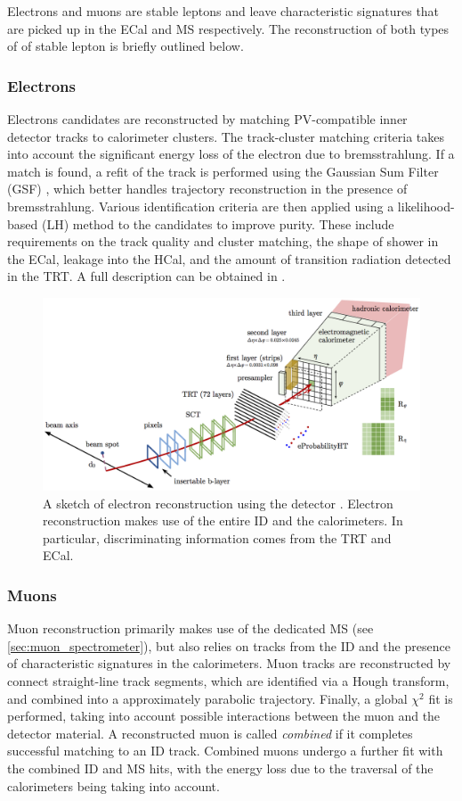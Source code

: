 Electrons and muons are stable leptons and leave characteristic signatures that are picked up in the ECal and MS respectively.
The reconstruction of both types of of stable lepton is briefly outlined below.

\subsubsection{Electrons}
Electrons candidates are reconstructed by matching PV-compatible inner detector tracks to calorimeter clusters.
The track-cluster matching criteria takes into account the significant energy loss of the electron due to bremsstrahlung.
If a match is found, a refit of the track is performed using the Gaussian Sum Filter (GSF) \cite{ATLAS-CONF-2012-047}, which better handles trajectory reconstruction in the presence of bremsstrahlung.
Various identification criteria are then applied using a  likelihood-based (LH) method to the candidates to improve purity.
These include requirements on the track quality and cluster matching, the shape of shower in the ECal, leakage into the HCal, and the amount of transition radiation detected in the TRT.
A full description can be obtained in .
%
\begin{figure}[!htbp]
  \centering
  \includegraphics[width=0.8\linewidth]{chapters/2.detector/figs/electron_reco.png}
  \caption{
    A sketch of electron reconstruction using the \ATLAS detector \cite{ATLAS-CONF-2016-024}.
    Electron reconstruction makes use of the entire ID and the calorimeters.
    In particular, discriminating information comes from the TRT and ECal.
  }
  \label{fig:electron_Reco}
\end{figure}
%


\subsubsection{Muons}
Muon reconstruction primarily makes use of the dedicated MS (see \cref{sec:muon_spectrometer}), but also relies on tracks from the ID and the presence of characteristic signatures in the calorimeters.
Muon tracks are reconstructed by connect straight-line track segments, which are identified via a Hough transform, and combined into a approximately parabolic trajectory.
Finally, a global $\chi^2$ fit is performed, taking into account possible interactions between the muon and the detector material.
A reconstructed muon is called \textit{combined} if it completes successful matching to an ID track.
Combined muons undergo a further fit with the combined ID and MS hits, with the energy loss due to the traversal of the calorimeters being taking into account.

